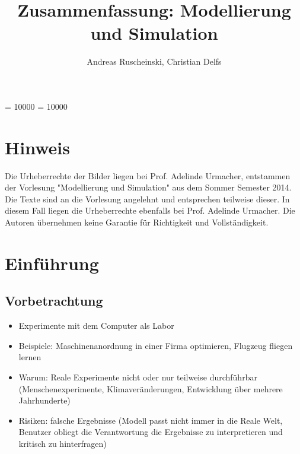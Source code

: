 \documentclass[11pt, fleqn, a4paper, leqno]{scrartcl} %
\title{Zusammenfassung: Modellierung und Simulation}
\author{Andreas Ruscheinski, Christian Delfs}
\date{}
\begin{document}
\maketitle
\tableofcontents
\widowpenalty = 10000
\clubpenalty = 10000

\section{Hinweis}
Die Urheberrechte der Bilder liegen bei Prof. Adelinde Urmacher, entstammen der Vorlesung "Modellierung und Simulation" aus dem Sommer Semester 2014. Die Texte sind an die Vorlesung angelehnt und entsprechen teilweise dieser. In diesem Fall liegen die Urheberrechte ebenfalls bei Prof. Adelinde Urmacher. Die Autoren übernehmen keine Garantie für Richtigkeit und Vollständigkeit.
\section{Einführung}
	\subsection{Vorbetrachtung}
	\begin{itemize}
		\item Experimente mit dem Computer als Labor
		\item Beispiele: Maschinenanordnung in einer Firma optimieren, Flugzeug fliegen lernen 
		\item Warum: Reale Experimente nicht oder nur teilweise durchführbar (Menschenexperimente, Klimaveränderungen, Entwicklung über mehrere Jahrhunderte)
		\item Risiken: falsche Ergebnisse (Modell passt nicht immer in die Reale Welt, Benutzer obliegt die Verantwortung die Ergebnisse zu interpretieren und kritisch zu hinterfragen)
	\end{itemize}
\end{document}
